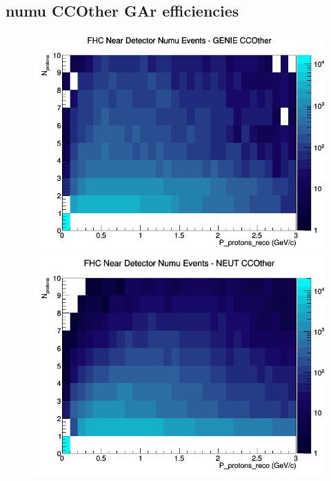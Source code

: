 \documentclass[12pt]{article}
\begin{document}
\subsection{numu CCOther GAr efficiencies}
\begin{figure}[h]
\includegraphics[width=\linewidth]{eff_N_P/GAr/protons/CCOther_FHC_ND_numu_N_P_GENIE.png}
\endminipage
{}
\includegraphics[width=\linewidth]{eff_N_P/GAr/protons/CCOther_FHC_ND_numu_N_P_NEUT.png}
\endminipage
{}

\end{figure}
\end{document}
